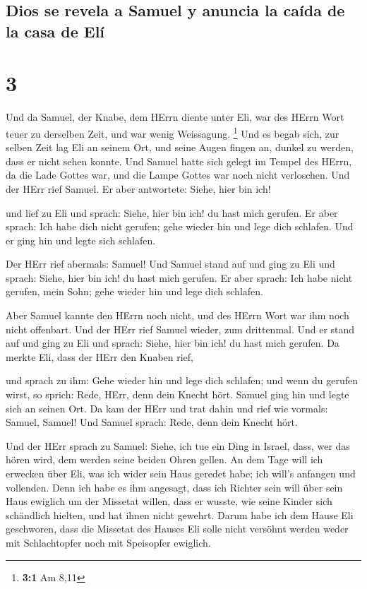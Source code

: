 \hypertarget{dios-se-revela-a-samuel-y-anuncia-la-cauxedda-de-la-casa-de-eluxed}{%
\subsection{Dios se revela a Samuel y anuncia la caída de la casa de
Elí}\label{dios-se-revela-a-samuel-y-anuncia-la-cauxedda-de-la-casa-de-eluxed}}

\hypertarget{section-2}{%
\section{3}\label{section-2}}

 Und da Samuel, der Knabe, dem HErrn diente unter Eli, war
des HErrn Wort teuer zu derselben Zeit, und war wenig Weissagung.
\footnote{\textbf{3:1} Am 8,11}  Und es begab sich, zur
selben Zeit lag Eli an seinem Ort, und seine Augen fingen an, dunkel zu
werden, dass er nicht sehen konnte.  Und Samuel hatte sich
gelegt im Tempel des HErrn, da die Lade Gottes war, und die Lampe Gottes
war noch nicht verloschen.  Und der HErr rief Samuel. Er
aber antwortete: Siehe, hier bin ich!

 und lief zu Eli und sprach: Siehe, hier bin ich! du hast
mich gerufen. Er aber sprach: Ich habe dich nicht gerufen; gehe wieder
hin und lege dich schlafen. Und er ging hin und legte sich schlafen.

 Der HErr rief abermals: Samuel! Und Samuel stand auf und
ging zu Eli und sprach: Siehe, hier bin ich! du hast mich gerufen. Er
aber sprach: Ich habe nicht gerufen, mein Sohn; gehe wieder hin und lege
dich schlafen.

 Aber Samuel kannte den HErrn noch nicht, und des HErrn
Wort war ihm noch nicht offenbart.  Und der HErr rief
Samuel wieder, zum drittenmal. Und er stand auf und ging zu Eli und
sprach: Siehe, hier bin ich! du hast mich gerufen. Da merkte Eli, dass
der HErr den Knaben rief,

 und sprach zu ihm: Gehe wieder hin und lege dich
schlafen; und wenn du gerufen wirst, so sprich: Rede, HErr, denn dein
Knecht hört. Samuel ging hin und legte sich an seinen Ort.
 Da kam der HErr und trat dahin und rief wie vormals:
Samuel, Samuel! Und Samuel sprach: Rede, denn dein Knecht hört.

 Und der HErr sprach zu Samuel: Siehe, ich tue ein Ding
in Israel, dass, wer das hören wird, dem werden seine beiden Ohren
gellen.  An dem Tage will ich erwecken über Eli, was ich
wider sein Haus geredet habe; ich will's anfangen und vollenden.
 Denn ich habe es ihm angesagt, dass ich Richter sein
will über sein Haus ewiglich um der Missetat willen, dass er wusste, wie
seine Kinder sich schändlich hielten, und hat ihnen nicht gewehrt.
 Darum habe ich dem Hause Eli geschworen, dass die
Missetat des Hauses Eli solle nicht versöhnt werden weder mit
Schlachtopfer noch mit Speisopfer ewiglich.


